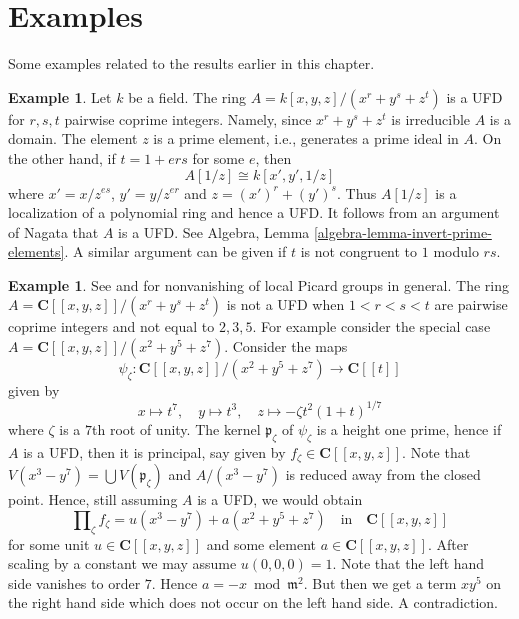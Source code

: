 \documentclass{stacks-project}
\newenvironment{reference}{\comment}{\endcomment}
\theoremstyle{plain}
\theoremstyle{definition}
\newtheorem{example}[subsection]{Example}
\theoremstyle{remark}
\numberwithin{equation}{subsection}
\begin{document}
\section{Examples}
\label{section-examples}

\noindent
Some examples related to the results earlier in this chapter.

\begin{example}
\label{example-factorial}
\begin{reference}
\cite[4(c)]{Samuel-UFD}
\end{reference}
Let $k$ be a field. The ring $A = k[x, y, z]/(x^r + y^s + z^t)$
is a UFD for $r, s, t$ pairwise coprime integers. Namely, since
$x^r + y^s + z^t$ is irreducible $A$ is a domain. The element $z$
is a prime element, i.e., generates a prime ideal in $A$.
On the other hand, if $t = 1 + ers$ for some $e$, then
$$
A[1/z] \cong k[x', y', 1/z]
$$
where $x' = x/z^{es}$, $y' = y/z^{er}$ and $z = (x')^r + (y')^s$.
Thus $A[1/z]$ is a localization of a polynomial ring and hence
a UFD. It follows from an argument of Nagata that $A$ is a UFD.
See Algebra, Lemma \ref{algebra-lemma-invert-prime-elements}.
A similar argument can be given if $t$ is not congruent to $1$
modulo $rs$.
\end{example}

\begin{example}
\label{example-completion-not-factorial}
\begin{reference}
See \cite{Brieskorn} and \cite{Lipman-rational} for nonvanishing of
local Picard groups in general.
\end{reference}
The ring $A = \mathbf{C}[[x, y, z]]/(x^r + y^s + z^t)$
is not a UFD when $1 < r < s < t$ are pairwise coprime integers
and not equal to $2, 3, 5$. For example consider the special
case $A = \mathbf{C}[[x, y, z]]/(x^2 + y^5 + z^7)$.
Consider the maps
$$
\psi_\zeta : \mathbf{C}[[x, y, z]]/(x^2 + y^5 + z^7) \to \mathbf{C}[[t]]
$$
given by
$$
x \mapsto t^7,\quad
y \mapsto t^3,\quad
z \mapsto -\zeta t^2(1 + t)^{1/7}
$$
where $\zeta$ is a $7$th root of unity. The kernel $\mathfrak p_\zeta$
of $\psi_\zeta$ is a height one prime, hence if $A$ is a UFD, then
it is principal, say given by $f_\zeta \in \mathbf{C}[[x, y, z]]$.
Note that $V(x^3 - y^7) = \bigcup V(\mathfrak p_\zeta)$
and $A/(x^3 - y^7)$ is reduced away from the closed point. Hence,
still assuming $A$ is a UFD, we would obtain
$$
\prod\nolimits_\zeta f_\zeta = u(x^3 - y^7) + a(x^2 + y^5 + z^7)
\quad\text{in}\quad
\mathbf{C}[[x, y, z]]
$$
for some unit $u \in \mathbf{C}[[x, y, z]]$ and some
element $a \in \mathbf{C}[[x, y, z]]$. After scaling by a constant
we may assume $u(0, 0, 0) = 1$. Note that the left hand side vanishes to
order $7$. Hence $a = - x \bmod \mathfrak m^2$. But then we get a term
$xy^5$ on the right hand side which does not occur on the left
hand side. A contradiction.
\end{example}
\end{document}

